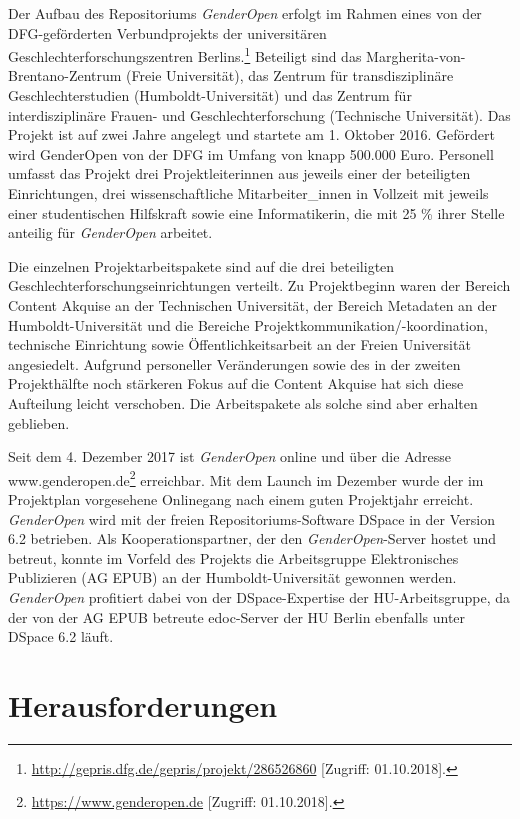 \documentclass[a4paper,
fontsize=11pt,
oneside,
numbers=noperiodatend,
parskip=half-,
bibliography=totoc,
final
]{scrartcl}
\begin{document}
Der Aufbau des Repositoriums \emph{GenderOpen} erfolgt im Rahmen eines
von der DFG-geförderten Verbundprojekts der universitären
Geschlechterforschungszentren Berlins.\footnote{\url{http://gepris.dfg.de/gepris/projekt/286526860}
  {[}Zugriff: 01.10.2018{]}.} Beteiligt sind das
Margherita-von-Brentano-Zentrum (Freie Universität), das Zentrum für
transdisziplinäre Geschlechterstudien (Humboldt-Universität) und das
Zentrum für interdisziplinäre Frauen- und Geschlechterforschung
(Technische Universität). Das Projekt ist auf zwei Jahre angelegt und
startete am 1. Oktober 2016. Gefördert wird GenderOpen von der DFG im
Umfang von knapp 500.000 Euro. Personell umfasst das Projekt drei
Projektleiterinnen aus jeweils einer der beteiligten Einrichtungen, drei
wissenschaftliche Mitarbeiter\_innen in Vollzeit mit jeweils einer
studentischen Hilfskraft sowie eine Informatikerin, die mit 25 \% ihrer
Stelle anteilig für \emph{GenderOpen} arbeitet.

Die einzelnen Projektarbeitspakete sind auf die drei beteiligten
Geschlechterforschungseinrichtungen verteilt. Zu Projektbeginn waren der
Bereich Content Akquise an der Technischen Universität, der Bereich
Metadaten an der Humboldt-Universität und die Bereiche
Projektkommunikation/-koordination, technische Einrichtung sowie
Öffentlichkeitsarbeit an der Freien Universität angesiedelt. Aufgrund
personeller Veränderungen sowie des in der zweiten Projekthälfte noch
stärkeren Fokus auf die Content Akquise hat sich diese Aufteilung leicht
verschoben. Die Arbeitspakete als solche sind aber erhalten geblieben.

Seit dem 4. Dezember 2017 ist \emph{GenderOpen} online und über die
Adresse www.genderopen.de\footnote{\url{https://www.genderopen.de}
  {[}Zugriff: 01.10.2018{]}.} erreichbar. Mit dem Launch im Dezember
wurde der im Projektplan vorgesehene Onlinegang nach einem guten
Projektjahr erreicht. \emph{GenderOpen} wird mit der freien
Repositoriums-Software DSpace in der Version 6.2 betrieben. Als
Kooperationspartner, der den \emph{GenderOpen}-Server hostet und
betreut, konnte im Vorfeld des Projekts die Arbeitsgruppe Elektronisches
Publizieren (AG EPUB) an der Humboldt-Universität gewonnen werden.
\emph{GenderOpen} profitiert dabei von der DSpace-Expertise der
HU-Arbeitsgruppe, da der von der AG EPUB betreute edoc-Server der HU
Berlin ebenfalls unter DSpace 6.2 läuft.

\hypertarget{herausforderungen}{%
\section{Herausforderungen}\label{herausforderungen}}
\end{document}
